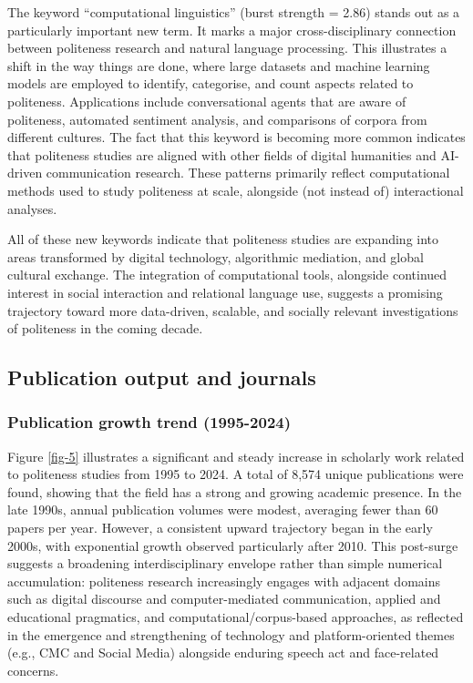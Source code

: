 \documentclass[english]{textolivre}
\begin{document}
The keyword ``computational linguistics'' (burst strength = 2.86) stands out as a particularly important new term. It marks a major cross-disciplinary connection between politeness research and natural language processing. This illustrates a shift in the way things are done, where large datasets and machine learning models are employed to identify, categorise, and count aspects related to politeness. Applications include conversational agents that are aware of politeness, automated sentiment analysis, and comparisons of corpora from different cultures. The fact that this keyword is becoming more common indicates that politeness studies are aligned with other fields of digital humanities and AI-driven communication research. These patterns primarily reflect computational methods used to study politeness at scale, alongside (not instead of) interactional analyses.

All of these new keywords indicate that politeness studies are expanding into areas transformed by digital technology, algorithmic mediation, and global cultural exchange. The integration of computational tools, alongside continued interest in social interaction and relational language use, suggests a promising trajectory toward more data-driven, scalable, and socially relevant investigations of politeness in the coming decade.

\subsection{Publication output and journals}
\subsubsection{Publication growth trend (1995-2024)}
Figure \ref{fig-5} illustrates a significant and steady increase in scholarly work related to politeness studies from 1995 to 2024. A total of 8,574 unique publications were found, showing that the field has a strong and growing academic presence. In the late 1990s, annual publication volumes were modest, averaging fewer than 60 papers per year. However, a consistent upward trajectory began in the early 2000s, with exponential growth observed particularly after 2010. This post-surge suggests a broadening interdisciplinary envelope rather than simple numerical accumulation: politeness research increasingly engages with adjacent domains such as digital discourse and computer-mediated communication, applied and educational pragmatics, and computational/corpus-based approaches, as reflected in the emergence and strengthening of technology and platform-oriented themes (e.g., CMC and Social Media) alongside enduring speech act and face-related concerns.
\end{document}
